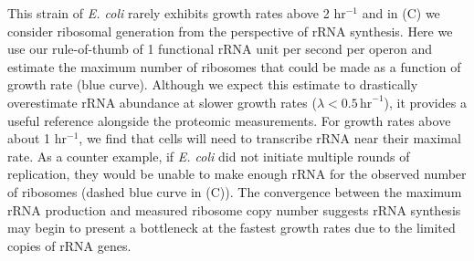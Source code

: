 This strain of \textit{E. coli} rarely exhibits growth rates above 2 hr$^{-1}$
\citep{bremer2008,roller2016} and in (C) we consider
ribosomal generation from the perspective of rRNA synthesis. Here we use our
rule-of-thumb of 1 functional rRNA unit per second per operon and estimate the
maximum number of ribosomes that could  be made as a function of growth rate
(blue curve).  Although we expect this estimate to drastically overestimate rRNA
abundance at slower growth rates ($\lambda < 0.5\, \text{hr}^{-1}$), it provides
a useful reference alongside the proteomic measurements. For growth rates above
about 1 hr$^{-1}$, we find that cells will need to transcribe rRNA near their
maximal rate. As a counter example, if \textit{E. coli} did not initiate
multiple rounds of replication, they would be unable to make enough rRNA for the
observed number of ribosomes (dashed blue curve in (C)). The
convergence between the maximum rRNA production and measured ribosome copy
number suggests rRNA synthesis may begin to present a bottleneck at the fastest
growth rates due to the limited copies of rRNA genes.
